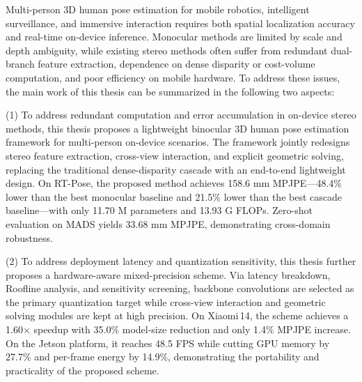 \begin{abstracten}\setlength{\baselineskip}{20pt}
  
Multi-person 3D human pose estimation for mobile robotics, intelligent surveillance, and immersive interaction requires both spatial localization accuracy and real-time on-device inference. Monocular methods are limited by scale and depth ambiguity, while existing stereo methods often suffer from redundant dual-branch feature extraction, dependence on dense disparity or cost-volume computation, and poor efficiency on mobile hardware. To address these issues, the main work of this thesis can be summarized in the following two aspects:

  (1) To address redundant computation and error accumulation in on-device stereo methods, this thesis proposes a lightweight binocular 3D human pose estimation framework for multi-person on-device scenarios. The framework jointly redesigns stereo feature extraction, cross-view interaction, and explicit geometric solving, replacing the traditional dense-disparity cascade with an end-to-end lightweight design. On RT-Pose, the proposed method achieves 158.6 mm MPJPE---48.4\% lower than the best monocular baseline and 21.5\% lower than the best cascade baseline---with only 11.70 M parameters and 13.93 G FLOPs. Zero-shot evaluation on MADS yields 33.68 mm MPJPE, demonstrating cross-domain robustness.

  (2) To address deployment latency and quantization sensitivity, this thesis further proposes a hardware-aware mixed-precision scheme. Via latency breakdown, Roofline analysis, and sensitivity screening, backbone convolutions are selected as the primary quantization target while cross-view interaction and geometric solving modules are kept at high precision. On Xiaomi\,14, the scheme achieves a 1.60$\times$ speedup with 35.0\% model-size reduction and only 1.4\% MPJPE increase. On the Jetson platform, it reaches 48.5 FPS while cutting GPU memory by 27.7\% and per-frame energy by 14.9\%, demonstrating the portability and practicality of the proposed scheme.

\end{abstracten}
